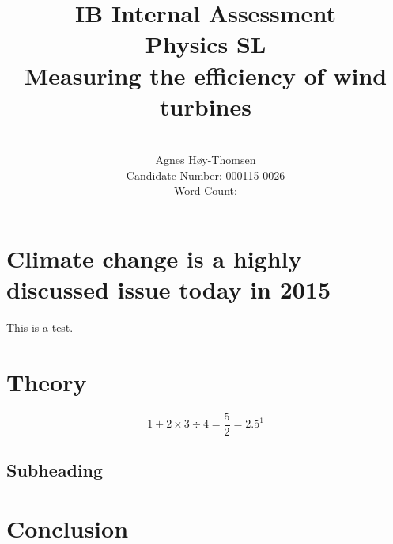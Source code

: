 \documentclass[12pt]{article}
\title{\textbf{IB Internal Assessment}\\\textbf{Physics SL}\\ \vspace{5cm}Measuring the efficiency of wind turbines}
\author{\vspace{5cm}\\Agnes H\o y-Thomsen\\Candidate Number: 000115-0026\\Word Count: }
\begin{document}
\maketitle
\clearpage
\vspace{5cm}
\tableofcontents
\newpage

\section{Climate change is a highly discussed issue today in 2015}
This is a test.
\section{Theory}
\begin{equation}
1 + 2 \times 3 \div 4 = \frac{5}{2} = 2.5^{1} 
\label{WRITE A UNIQUE NAME HERE}
\end{equation}
\subsection{Subheading}
\section{Conclusion}



\nocite{*}
\newpage






\end{document}
